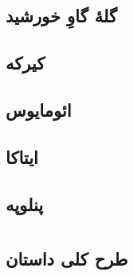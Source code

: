\documentclass[12pt,onecolumn,a4paper]{book}
\begin{document}
    \chapter{گلۀ گاوِ خورشید}
    \chapter{کیرکه}
    \chapter{ائومایوس}
    \chapter{ایتاکا}
    \chapter{پنلوپه}

    \part{}
    \chapter{طرح کلی داستان}

    \part{}
    \clearpage
    \printglossary[title={واژه‌نامه},toctitle={واژه‌نامه}]
\end{document}
